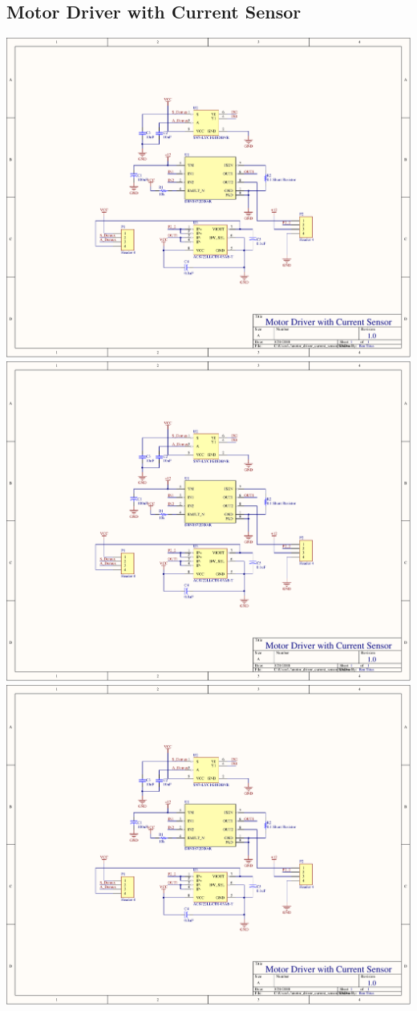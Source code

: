 \begin{flushleft}
\section{Motor Driver with Current Sensor}
\end{flushleft}
\label{app:motor_driver_current}
\centering
\includegraphics[page=1,width=\textwidth,angle=270]{PDFs/motor_driver_with_current_sensor.PDF} \newpage
\includegraphics[page=2,width=\textwidth,angle=270]{PDFs/motor_driver_with_current_sensor.PDF} \newpage
\includegraphics[page=3,width=\textwidth,angle=270]{PDFs/motor_driver_with_current_sensor.PDF} \newpage